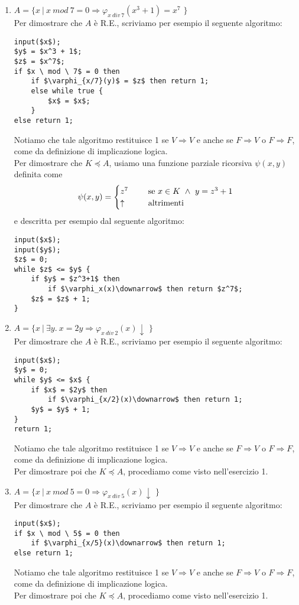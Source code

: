 \documentclass[a4paper,oneside,titlepage]{book}
\begin{document}
\begin{enumerate}[label=\fbox{\arabic*}]
\newpage
\item $A = \text{\{ } x \ | \ x \ mod \ 7 = 0 \Rightarrow \varphi_{x \ div \ 7}(x^3 + 1) = x^7 \text{ \}}$
\\ Per dimostrare che $A$ è R.E., scriviamo per esempio il seguente algoritmo:
\begin{lstlisting}
input($x$);
$y$ = $x^3 + 1$;
$z$ = $x^7$;
if $x \ mod \ 7$ = 0 then
    if $\varphi_{x/7}(y)$ = $z$ then return 1;
    else while true {
        $x$ = $x$;
    }
else return 1;
\end{lstlisting}
Notiamo che tale algoritmo restituisce 1 se $V \Rightarrow V$ e anche se $F \Rightarrow V$ o $F \Rightarrow F$, come da definizione di implicazione logica.
\\ Per dimostrare che $K \preceq A$, usiamo una funzione parziale ricorsiva $\psi(x,y)$ definita come
\[
\psi(x,y) =
\begin{cases}
z^7& \hspace{0.5cm} \text{se } x \in K \ \wedge \ y = z^3 + 1 \\
\uparrow& \hspace{0.5cm} \text{altrimenti}
\end{cases}
\]
e descritta per esempio dal seguente algoritmo:
\begin{lstlisting}
input($x$);
input($y$);
$z$ = 0;
while $z$ <= $y$ {
    if $y$ = $z^3+1$ then
        if $\varphi_x(x)\downarrow$ then return $z^7$;
    $z$ = $z$ + 1;
}
\end{lstlisting}

\item $A = \text{\{ } x \ | \ \exists y. \ x = 2y \Rightarrow \varphi_{x \ div \ 2}(x)\downarrow \text{ \}}$
\\ Per dimostrare che $A$ è R.E., scriviamo per esempio il seguente algoritmo:
\begin{lstlisting}
input($x$);
$y$ = 0;
while $y$ <= $x$ {
    if $x$ = $2y$ then
        if $\varphi_{x/2}(x)\downarrow$ then return 1;
    $y$ = $y$ + 1;
}
return 1;
\end{lstlisting}
Notiamo che tale algoritmo restituisce 1 se $V \Rightarrow V$ e anche se $F \Rightarrow V$ o $F \Rightarrow F$, come da definizione di implicazione logica.
\\ Per dimostrare poi che $K \preceq A$, procediamo come visto nell'esercizio 1.

\item $A = \text{\{ } x \ | \ x \ mod \ 5 = 0 \Rightarrow \varphi_{x \ div \ 5}(x)\downarrow \text{ \}}$
\\ Per dimostrare che $A$ è R.E., scriviamo per esempio il seguente algoritmo:
\begin{lstlisting}
input($x$);
if $x \ mod \ 5$ = 0 then
    if $\varphi_{x/5}(x)\downarrow$ then return 1;
else return 1;
\end{lstlisting}
Notiamo che tale algoritmo restituisce 1 se $V \Rightarrow V$ e anche se $F \Rightarrow V$ o $F \Rightarrow F$, come da definizione di implicazione logica.
\\ Per dimostrare poi che $K \preceq A$, procediamo come visto nell'esercizio 1.


\end{enumerate}
\end{document}
